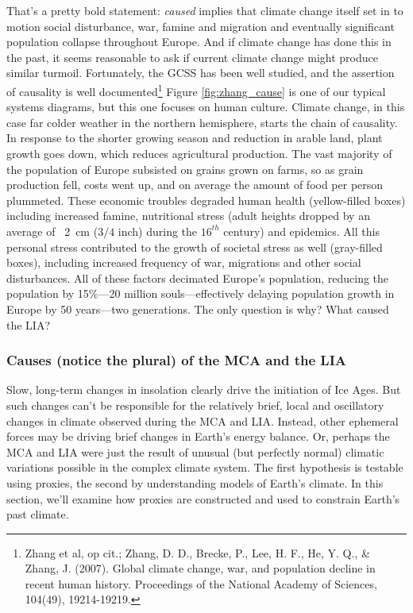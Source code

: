 \documentclass[amstex,12pt]{book}
\begin{document}
That's a pretty bold statement: \emph{caused} implies that climate change itself set in to motion social disturbance, war, famine and migration and eventually significant population collapse throughout Europe. And if climate change has done this in the past, it seems reasonable to ask if current climate change might produce similar turmoil. Fortunately, the GCSS has been well studied, and the assertion of causality is well documented\footnote{Zhang et al, op cit.; Zhang, D. D., Brecke, P., Lee, H. F., He, Y. Q., \& Zhang, J. (2007). Global climate change, war, and population decline in recent human history. Proceedings of the National Academy of Sciences, 104(49), 19214-19219.} Figure \ref{fig:zhang_cause} is one of our typical systems diagrams, but this one focuses on human culture. Climate change, in this case far colder weather in the northern hemisphere, starts the chain of causality. In response to the shorter growing season and reduction in arable land, plant growth goes down, which reduces agricultural production. The vast majority of the population of Europe subsisted on grains grown on farms, so as grain production fell, costs went up, and on average the amount of food per person plummeted. These economic troubles degraded human health (yellow-filled boxes) including increased famine, nutritional stress (adult heights dropped by an average of ~\SI{2}{\centi\metre} ($3/4$ inch) during the $16^{th}$ century) and epidemics. All this personal stress contributed to the growth of societal stress as well (gray-filled boxes), including increased frequency of war, migrations and other social disturbances. All of these factors decimated Europe's population, reducing the population by 15\%---20 million souls---effectively delaying population growth in Europe by 50 years---two generations. The only question is why? What caused the LIA?

\subsubsection{Causes (notice the plural) of the MCA and the LIA}
Slow, long-term changes in insolation clearly drive the initiation of Ice Ages. But such changes can't be responsible for the relatively brief, local and oscillatory changes in climate observed during the MCA and LIA. Instead, other ephemeral forces may be driving brief changes in Earth's energy balance. Or, perhaps the MCA and LIA were just the result of unusual (but perfectly normal) climatic variations possible in the complex climate system. The first hypothesis is testable using proxies, the second by understanding models of Earth's climate. In this section, we'll examine how proxies are constructed and used to constrain Earth's past climate. 
\end{document}
